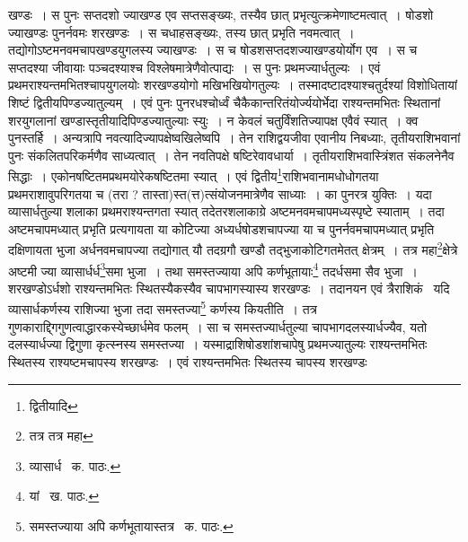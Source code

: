 \documentclass[11pt, openany]{book}
\begin{document}
\noindent खण्डः~। स पुनः सप्तदशो ज्याखण्ड एव सप्तसङ्ख्यः, तस्यैव छात् प्रभृत्युत्क्रमेणाष्टमत्वात्~। षोडशो ज्याखण्डः पुनर्नवमः शरखण्डः~। स चधाहसङ्ख्यः, तस्य छात् प्रभृति नवमत्वात्~। तद्योगोऽष्टमनवमचापखण्डयुगलस्य ज्याखण्डः~। स च षोडशसप्तदशज्याखण्डयोर्योग एव~। स च सप्तदश्या जीवायाः पञ्चदश्याश्च विश्लेषमात्रेणैवोत्पाद्यः~। स पुनः प्रथमज्यार्धतुल्यः~। एवं प्रथमराश्यन्तमभितश्चापयुगलयोः शरखण्डयोगो मखिभखियोगतुल्यः~। तस्मादष्टादश्याश्चतुर्दश्यां विशोधितायां शिष्टं द्वितीयपिण्डज्यातुल्यम्~। एवं पुनः पुनरधश्चोर्ध्वं चैकैकान्तरितंयोर्ज्ययोर्भेदा राश्यन्तमभितः स्थितानां शरयुगलानां खण्डास्तृतीयादिपिण्डज्यातुल्याः स्युः~। न केवलं चतुर्विंशतिज्यापक्ष एवैवं स्यात्~। क्व पुनस्तर्हि~। अन्यत्रापि नवत्यादिज्यापक्षेष्वखिलेष्वपि~। तेन राशिद्वयजीवा एवानीय निबध्याः, तृतीयराशिभवानां पुनः संकलितपरिकर्मणैव साध्यत्वात्~। तेन नवतिपक्षे षष्टिरेवावधार्या~। तृतीयराशिभवास्त्रिंशत संकलनेनैव सिद्धाः~। एकोनषष्टितमप्रथमयोरेकषष्टितमा स्यात्~। एवं द्वितीय\renewcommand{\thefootnote}{१}\footnote{द्वितीयादि}राशिभवानामधोधोगतया प्रथमराशावुपरिगतया च (तरा ? तास्ता)स्त(त्त)त्संयोजनमात्रेणैव साध्याः~। का पुनरत्र युक्तिः~। यदा व्यासार्धतुल्या शलाका प्रथमराश्यन्तगता स्यात् तदेतरशलाकाग्रे अष्टमनवमचापमध्यस्पृष्टे स्याताम्~। तदा अष्टमचापमध्यात् प्रभृति प्रत्यगायता या कोटिज्या अध्यर्धषोडशचापज्या या च पुनर्नवमचापमध्यात् प्रभृति दक्षिणायता भुजा अर्धनवमचापज्या तद्योगात् यौ तदग्रगौ खण्डौ तद्भुजाकोटिगतमेतत् क्षेत्रम्~। तत्र महा\renewcommand{\thefootnote}{२}\footnote{तत्र तत्र महा}क्षेत्रे अष्टमी ज्या व्यासार्धर्ध\renewcommand{\thefootnote}{३}\footnote{व्यासार्ध \textendash\ क. पाठः.}समा भुजा~। तथा समस्तज्याया अपि कर्णभूतायाः\renewcommand{\thefootnote}{४}\footnote{यां \textendash\ ख. पाठः.} तदर्धसमा सैव भुजा~। शरखण्डोऽर्धशो राश्यन्तमभितः स्थितस्यैकस्यैव चापभागस्यास्य शरखण्डः~। तदानयन एवं त्रैराशिकं \textendash\ यदि व्यासार्धकर्णस्य राशिज्या भुजा तदा समस्तज्या\renewcommand{\thefootnote}{५}\footnote{समस्तज्याया अपि कर्णभूतायास्तत्र \textendash\ क. पाठः.} कर्णस्य कियतीति~। तत्र गुणकाराद्द्गिगुणत्वाद्धारकस्येच्छार्धमेव फलम्~। सा च समस्तज्यार्धतुल्या चापभागदलस्यार्धज्यैव, यतो दलस्यार्धज्या द्विगुणा कृत्स्नस्य समस्तज्या~। यस्माद्राशिषोडशांशचापेषु प्रथमज्यातुल्यः राश्यन्तमभितः स्थितस्य राश्यष्टमचापस्य शरखण्डः~। एवं राश्यन्तमभितः स्थितस्य चापस्य शरखण्डः
\end{document}

